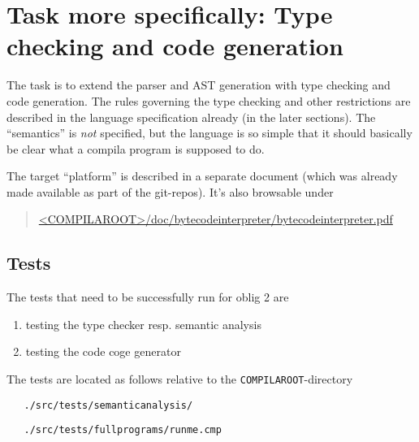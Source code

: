 \documentclass[11pt,freeform]{handout}[2014/08/13]
\begin{document}
\section{Task more specifically: Type checking and code generation}
\label{sec:task-more-spec}



The task is to extend the parser and AST generation with type checking and
code generation. The rules governing the type checking and other
restrictions are described in the language specification already (in the
later sections). The ``semantics'' is \emph{not} specified, but the
language is so simple that it should basically be clear what a compila
program is supposed to do.

The target ``platform'' is described in a separate document (which was
already made available as part of the git-repos). It's also browsable under


\begin{quote}
  \url{<COMPILAROOT>/doc/bytecodeinterpreter/bytecodeinterpreter.pdf}
\end{quote}






\subsection*{Tests}
\label{sec:tests}

The tests that need to be successfully run for oblig 2 are
\begin{enumerate}
\item testing the type checker resp. semantic analysis
\item testing the code coge generator
\end{enumerate}


The tests are located as follows relative to the
\texttt{COMPILAROOT}-directory

\begin{verbatim}
   ./src/tests/semanticanalysis/
\end{verbatim}


\begin{verbatim}
   ./src/tests/fullprograms/runme.cmp
\end{verbatim}
\end{document}
